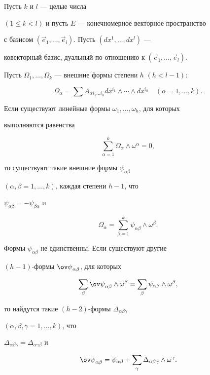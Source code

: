 \begin{lemCL} Пусть $k$ и $l$ --- целые числа


$(1 \leq k < l)$ и пусть $E$ --- конечномерное векторное пространство


с базисом $(\Vec e_1,\dotsc,\Vec e_l)$. Пусть $(dx^1,\dotsc,dx^l)$ ---


ковекторный базис, дуальный по отношению к $(\Vec e_1,\dotsc,\Vec e_l)$.


Пусть $\Omega_1,\dotsc,\Omega_k$ --- внешние формы степени $h$ $(h < l - 1):$


$$


\Omega_\alpha = \sum A_{\alpha i_1 \dotsc i_h} dx^{i_1} \wedge \dotsb


\wedge dx^{i_h}\quad (\alpha = 1,\dotsc,k).


$$


Если существуют линейные формы $\omega_1,\dotsc,\omega_h$, для которых


выполняются равенства


$$


\sum_{\alpha = 1}^k \Omega_\alpha \wedge \omega^\alpha = 0,


$$


то существуют такие внешние формы $\psi_{\alpha \beta}$


$(\alpha,\beta = 1,\dotsc,k)$, каждая степени $h-1$, что


$\psi_{\alpha \beta} = - \psi_{\beta \alpha}$ и


$$


\Omega_\alpha = \sum_{\beta=1}^k \psi_{\alpha \beta} \wedge \omega^\beta.


$$


Формы $\psi_{\alpha \beta}$ не единственны. Если существуют другие


$(h-1)$-формы ${\ov \psi}_{\alpha \beta}$, для которых


$$


\sum_\beta {\ov \psi}_{\alpha \beta} \wedge \omega^\beta =


\sum_\beta \psi_{\alpha \beta} \wedge \omega^\beta,


$$


то найдутся такие $(h-2)$-формы $\Delta_{\alpha \beta \gamma}$


$(\alpha, \beta, \gamma = 1,\dotsc,k)$, что


$\Delta _{\alpha \beta \gamma} = \Delta_{\alpha \gamma \beta}$ и


$$


{\ov \psi}_{\alpha \beta} = \psi_{\alpha \beta} +


\sum_\gamma \Delta_{\alpha \beta \gamma} \wedge \omega^\gamma.


$$


\end{lemCL}





